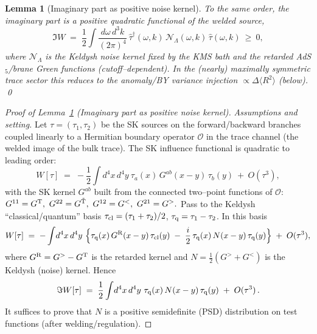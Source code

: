 \documentclass[10pt]{article}
\theoremstyle{definition}
\theoremstyle{plain}
\newtheorem{lemma}{Lemma}[section]
\begin{document}
\begin{lemma}[Imaginary part as positive noise kernel]
\label{lem:ImW-noise}
To the same order, the imaginary part is a positive quadratic functional of the welded source,
\[
\Im W\;=\;\frac12\int\!\frac{d\omega\,d^3k}{(2\pi)^4}\ \widehat{\tau}^\dagger(\omega,k)\,
\mathcal N_\Lambda(\omega,k)\,\widehat{\tau}(\omega,k)\ \ge\ 0,
\]
where $\mathcal N_\Lambda$ is the Keldysh noise kernel fixed by the KMS bath and the retarded AdS$_5$/brane Green functions (cutoff–dependent). In the (nearly) maximally symmetric trace sector this reduces to the anomaly/BY variance injection $\propto \Delta\!\langle R^2\rangle$ (below).
\qed
\end{lemma}
\begin{proof}[Proof of Lemma~\ref{lem:ImW-noise} (Imaginary part as positive noise kernel)]
\emph{Assumptions and setting.}
Let $\tau=(\tau_1,\tau_2)$ be the SK sources on the forward/backward branches coupled linearly to a Hermitian boundary operator $\mathcal O$ in the trace channel (the welded image of the bulk trace). The SK influence functional is quadratic to leading order:
\[
W[\tau]\;=\;-\frac{1}{2}\int\! d^4x\,d^4y\ \tau_a(x)\,G^{ab}(x-y)\,\tau_b(y)\ +\ O(\tau^3),
\]
with the SK kernel $G^{ab}$ built from the connected two–point functions of $\mathcal O$:
\(
G^{11}=G^{\rm T},\ G^{22}=G^{\tilde{\rm T}},\ G^{12}=G^{<},\ G^{21}=G^{>}.
\)
Pass to the Keldysh ``classical/quantum'' basis $\tau_{\rm cl}=(\tau_1+\tau_2)/2$, $\tau_{\rm q}=\tau_1-\tau_2$. In this basis
\[
W[\tau]\;=\;-\int\! d^4x\,d^4y\ \Big\{\tau_{\rm q}(x)\,G^{\rm R}(x-y)\,\tau_{\rm cl}(y)\;-\;\frac{i}{2}\,\tau_{\rm q}(x)\,N(x-y)\,\tau_{\rm q}(y)\Big\}\;+\;O(\tau^3),
\]
where $G^{\rm R}=G^{>}-G^{\rm T}$ is the retarded kernel and $N=\tfrac12(G^{>}+G^{<})$ is the Keldysh (noise) kernel. Hence
\[
\Im W[\tau]\;=\;\frac{1}{2}\int\! d^4x\,d^4y\ \tau_{\rm q}(x)\,N(x-y)\,\tau_{\rm q}(y)\;+\;O(\tau^3)\,.
\]
It suffices to prove that $N$ is a positive semidefinite (PSD) distribution on test functions (after welding/regulation).


\end{proof}
\end{document}
